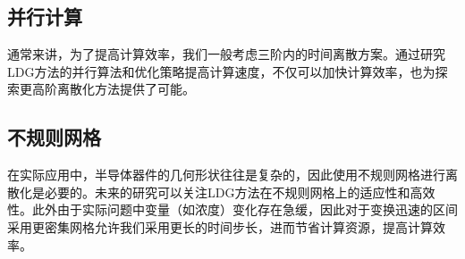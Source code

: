 \subsection{并行计算}
通常来讲，为了提高计算效率，我们一般考虑三阶内的时间离散方案\cite{wang2016stability}。通过研究LDG方法的并行算法和优化策略提高计算速度，不仅可以加快计算效率，也为探索更高阶离散化方法提供了可能。

\subsection{不规则网格}
在实际应用中，半导体器件的几何形状往往是复杂的，因此使用不规则网格进行离散化是必要的。未来的研究可以关注LDG方法在不规则网格上的适应性和高效性。此外由于实际问题中变量（如浓度）变化存在急缓，因此对于变换迅速的区间采用更密集网格允许我们采用更长的时间步长，进而节省计算资源，提高计算效率\cite{肖红单2023半导体}。


\newpage
\begingroup
{}
\printbibliography[title={参考文献}]
\endgroup
